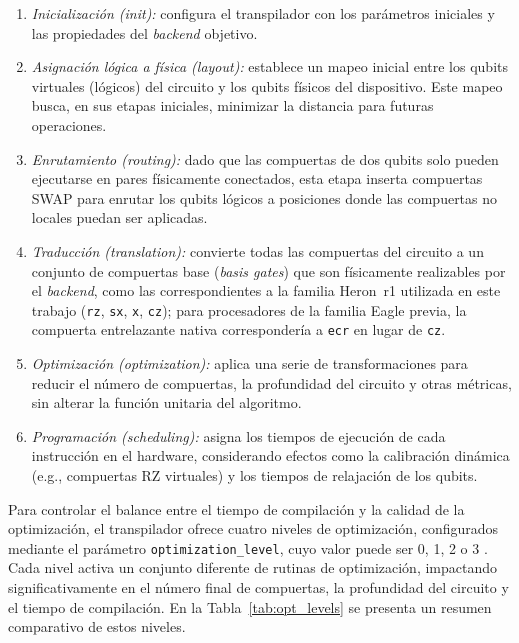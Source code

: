 \documentclass[12pt, spanish]{book}
\begin{document}
\begin{enumerate}
    \item \textit{Inicialización (init):} configura el transpilador con los parámetros iniciales y las propiedades del \textit{backend} objetivo.
    \item \textit{Asignación lógica a física (layout):} establece un mapeo inicial entre los qubits virtuales (lógicos) del circuito y los qubits físicos del dispositivo. Este mapeo busca, en sus etapas iniciales, minimizar la distancia para futuras operaciones.
    \item \textit{Enrutamiento (routing):} dado que las compuertas de dos qubits solo pueden ejecutarse en pares físicamente conectados, esta etapa inserta compuertas SWAP para enrutar los qubits lógicos a posiciones donde las compuertas no locales puedan ser aplicadas.
    \item \textit{Traducción (translation):} convierte todas las compuertas del circuito a un conjunto de compuertas base (\textit{basis gates}) que son físicamente realizables por el \textit{backend}, como las correspondientes a la familia Heron~r1 utilizada en este trabajo (\texttt{rz}, \texttt{sx}, \texttt{x}, \texttt{cz}); para procesadores de la familia Eagle previa, la compuerta entrelazante nativa correspondería a \texttt{ecr} en lugar de \texttt{cz}.
    \item \textit{Optimización (optimization):} aplica una serie de transformaciones para reducir el número de compuertas, la profundidad del circuito y otras métricas, sin alterar la función unitaria del algoritmo.
    \item \textit{Programación (scheduling):} asigna los tiempos de ejecución de cada instrucción en el hardware, considerando efectos como la calibración dinámica (e.g., compuertas RZ virtuales) y los tiempos de relajación de los qubits.
\end{enumerate}

Para controlar el balance entre el tiempo de compilación y la calidad de la optimización, el transpilador ofrece cuatro niveles de optimización, configurados mediante el parámetro \texttt{optimization\_level}, cuyo valor puede ser 0, 1, 2 o 3 \cite{IBM_optimization_2025}. Cada nivel activa un conjunto diferente de rutinas de optimización, impactando significativamente en el número final de compuertas, la profundidad del circuito y el tiempo de compilación. En la Tabla~\ref{tab:opt_levels} se presenta un resumen comparativo de estos niveles.
\end{document}
